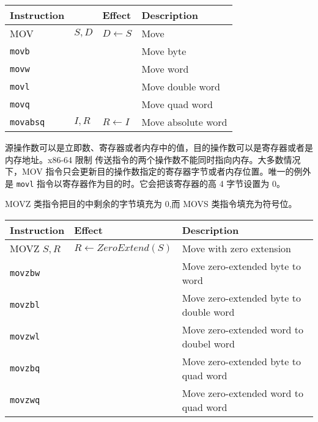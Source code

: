 \begin{table}[!ht]
    \centering
    \begin{tabular}{llll}
        \toprule
        Instruction & & Effect & Description \\
        \midrule
        MOV                & $S, D$ & $D \leftarrow S$  & Move \\
        \quad\texttt{movb} &        &                   & Move byte \\
        \quad\texttt{movw} &        &                   & Move word \\
        \quad\texttt{movl} &        &                   & Move double word \\
        \quad\texttt{movq} &        &                   & Move quad word \\
        \texttt{movabsq}   & $I, R$ & $R \leftarrow I$  & Move absolute word \\
        \bottomrule
    \end{tabular}
\end{table}


源操作数可以是立即数、寄存器或者内存中的值，目的操作数可以是寄存器或者是内存地址。x86-64 限制 传送指令的两个操作数不能同时指向内存。大多数情况下，MOV 指令只会更新目的操作数指定的寄存器字节或者内存位置。唯一的例外是 \verb|movl| 指令以寄存器作为目的时。它会把该寄存器的高 4 字节设置为 0。

MOVZ 类指令把目的中剩余的字节填充为 0,而 MOVS 类指令填充为符号位。

\begin{table}[!ht]
    \centering
    \begin{tabular}{lll}
        \toprule
        Instruction & Effect & Description \\
        \midrule
        MOVZ \quad $S, R$ & $R \leftarrow ZeroExtend(S)$ & Move with zero extension \\
        \quad\texttt{movzbw} & & Move zero-extended byte to word \\
        \quad\texttt{movzbl} & & Move zero-extended byte to double word \\
        \quad\texttt{movzwl} & & Move zero-extended word to doubel word \\
        \quad\texttt{movzbq} & & Move zero-extended byte to quad word \\
        \quad\texttt{movzwq} & & Move zero-extended word to quad word \\
        \bottomrule
    \end{tabular}
\end{table}

